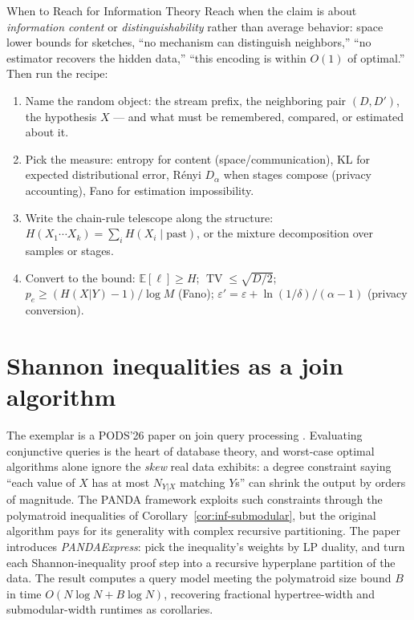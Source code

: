 \begin{reachbox}{When to Reach for Information Theory}
Reach when the claim is about \emph{information content} or
\emph{distinguishability} rather than average behavior: space lower bounds for
sketches, ``no mechanism can distinguish neighbors,'' ``no estimator recovers the
hidden data,'' ``this encoding is within $O(1)$ of optimal.'' Then run the recipe:
\begin{enumerate}
\item Name the random object: the stream prefix, the neighboring pair $(D, D')$, the
  hypothesis $X$ --- and what must be remembered, compared, or estimated about it.
\item Pick the measure: entropy for content (space/communication), KL for expected
  distributional error, R\'enyi $D_\alpha$ when stages compose (privacy accounting),
  Fano for estimation impossibility.
\item Write the chain-rule telescope along the structure: $H(X_1 \cdots X_k) = \sum_i
  H(X_i \mid \text{past})$, or the mixture decomposition over samples or stages.
\item Convert to the bound: $\mathbb{E}[\ell] \ge H$; $\operatorname{TV} \le
  \sqrt{D/2}$; $p_e \ge (H(X|Y)-1)/\log M$ (Fano); $\varepsilon' = \varepsilon +
  \ln(1/\delta)/(\alpha-1)$ (privacy conversion).
\end{enumerate}
\end{reachbox}

\section{Shannon inequalities as a join algorithm}
\label{sec:inf-panda}

The exemplar is a PODS'26 paper on join query processing \citep{sigmod26-185}\pods.
Evaluating conjunctive queries is the heart of database theory, and worst-case optimal
algorithms alone ignore the \emph{skew} real data exhibits: a degree constraint saying
``each value of $X$ has at most $N_{Y|X}$ matching $Y$s'' can shrink the output by
orders of magnitude. The PANDA framework exploits such constraints through the
polymatroid inequalities of Corollary~\ref{cor:inf-submodular}, but the original
algorithm pays for its generality with complex recursive partitioning. The paper
introduces \emph{PANDAExpress}: pick the inequality's weights by LP duality, and turn
each Shannon-inequality proof step into a recursive hyperplane partition of the data.
The result computes a query model meeting the polymatroid size bound $B$ in time
$O(N \log N + B \log N)$, recovering fractional hypertree-width and submodular-width
runtimes as corollaries.

